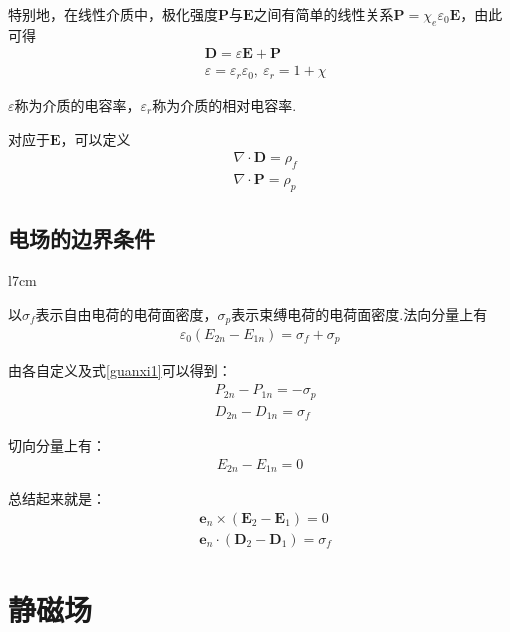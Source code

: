 \documentclass[main.tex]{subfiles}
\begin{document}
特别地，在线性介质中，极化强度$\boldsymbol{P}$与$\boldsymbol{E}$之间有简单的线性关系$\boldsymbol{P} = \chi _e \varepsilon _0 \boldsymbol{E}$，由此可得
\begin{align}
    \label{guanxi1}&\boldsymbol{D} = \varepsilon \boldsymbol{E} + \boldsymbol{P}\\
    &\varepsilon = \varepsilon _r \varepsilon _0,\ \varepsilon _r = 1+\chi 
\end{align}

$\varepsilon $称为介质的电容率，$\varepsilon _r$称为介质的相对电容率.

对应于$\boldsymbol{E}$，可以定义
\begin{align}
    &\nabla \cdot \boldsymbol{D} = \rho_{f}\\
    &\nabla \cdot \boldsymbol{P} = \rho_{p}
\end{align}

\subsection{电场的边界条件}

\begin{wrapfigure}{l}{7cm}
	\centering
	
\end{wrapfigure}

以$\sigma _f$表示自由电荷的电荷面密度，$\sigma _p$表示束缚电荷的电荷面密度.法向分量上有
\begin{align}
    \varepsilon _0(E_{2n} - E_{1n}) = \sigma _f + \sigma _p
\end{align}

由各自定义及式\ref{guanxi1}可以得到：
\begin{align}
    &P_{2n} - P_{1n} = - \sigma _p\\
    &D_{2n} - D_{1n} = \sigma _f
\end{align}

切向分量上有：
\begin{align}
    E_{2n} - E_{1n} = 0
\end{align}

总结起来就是：
\begin{align}
    &\boldsymbol{e}_n \times (\boldsymbol{E}_2 - \boldsymbol{E}_1) = 0\\
    &\boldsymbol{e}_n \cdot (\boldsymbol{D}_2 - \boldsymbol{D}_1) = \sigma _f
\end{align}

\section{静磁场}
\end{document}
